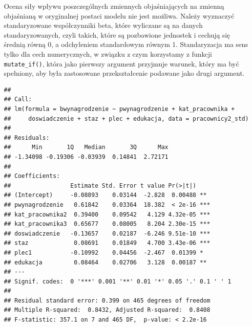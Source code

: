 \documentclass[
]{book}
\newenvironment{Shaded}{\begin{snugshade}}{\end{snugshade}}
\newcommand{\DataTypeTok}[1]{\textcolor[rgb]{0.13,0.29,0.53}{#1}}
\newcommand{\KeywordTok}[1]{\textcolor[rgb]{0.13,0.29,0.53}{\textbf{#1}}}
\newcommand{\NormalTok}[1]{#1}
\newcommand{\OperatorTok}[1]{\textcolor[rgb]{0.81,0.36,0.00}{\textbf{#1}}}
\newcommand{\StringTok}[1]{\textcolor[rgb]{0.31,0.60,0.02}{#1}}
\begin{document}
Ocena siły wpływu poszczególnych zmiennych objaśniających na zmienną objaśnianą w oryginalnej postaci modelu nie jest możliwa. Należy wyznaczyć standaryzowane współczynniki beta, które wyliczane są na danych standaryzowanych, czyli takich, które są pozbawione jednostek i cechują się średnią równą 0, a odchyleniem standardowym równym 1. Standaryzacja ma sens tylko dla cech numerycznych, w związku z czym korzystamy z funkcji \texttt{mutate\_if()}, która jako pierwszy argument przyjmuje warunek, który ma być spełniony, aby była zastosowane przekształcenie podawane jako drugi argument.

\begin{Shaded}
\end{Shaded}

\begin{verbatim}
## 
## Call:
## lm(formula = bwynagrodzenie ~ pwynagrodzenie + kat_pracownika + 
##     doswiadczenie + staz + plec + edukacja, data = pracownicy2_std)
## 
## Residuals:
##      Min       1Q   Median       3Q      Max 
## -1.34098 -0.19306 -0.03939  0.14841  2.72171 
## 
## Coefficients:
##                 Estimate Std. Error t value Pr(>|t|)    
## (Intercept)     -0.08893    0.03144  -2.828  0.00488 ** 
## pwynagrodzenie   0.61842    0.03364  18.382  < 2e-16 ***
## kat_pracownika2  0.39400    0.09542   4.129 4.32e-05 ***
## kat_pracownika3  0.65677    0.08005   8.204 2.30e-15 ***
## doswiadczenie   -0.13657    0.02187  -6.246 9.51e-10 ***
## staz             0.08691    0.01849   4.700 3.43e-06 ***
## plec1           -0.10992    0.04456  -2.467  0.01399 *  
## edukacja         0.08464    0.02706   3.128  0.00187 ** 
## ---
## Signif. codes:  0 '***' 0.001 '**' 0.01 '*' 0.05 '.' 0.1 ' ' 1
## 
## Residual standard error: 0.399 on 465 degrees of freedom
## Multiple R-squared:  0.8432, Adjusted R-squared:  0.8408 
## F-statistic: 357.1 on 7 and 465 DF,  p-value: < 2.2e-16
\end{verbatim}
\end{document}
